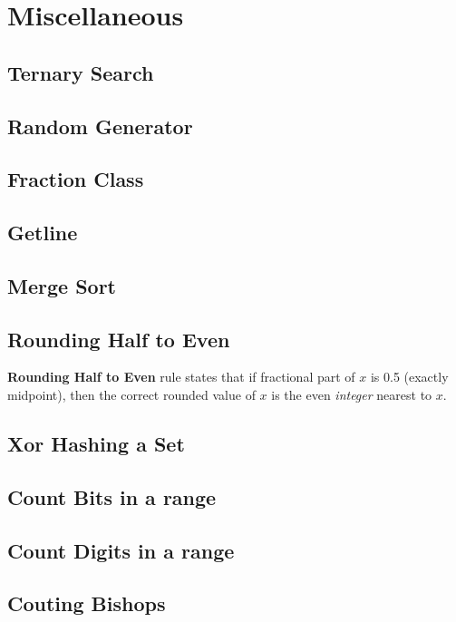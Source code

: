 \chapter{Miscellaneous}

\section{Ternary Search}


\section{Random Generator}


\section{Fraction Class}


\section{Getline}


\section{Merge Sort}


\section{Rounding Half to Even}

    \textbf{Rounding Half to Even} rule states that 
    if fractional part of $x$ is 0.5 (exactly midpoint), then the correct rounded value of $x$ is the even \textit{integer} nearest to $x$.


\section{Xor Hashing a Set}


\section{Count Bits in a range}


\section{Count Digits in a range}


\section{Couting Bishops}


